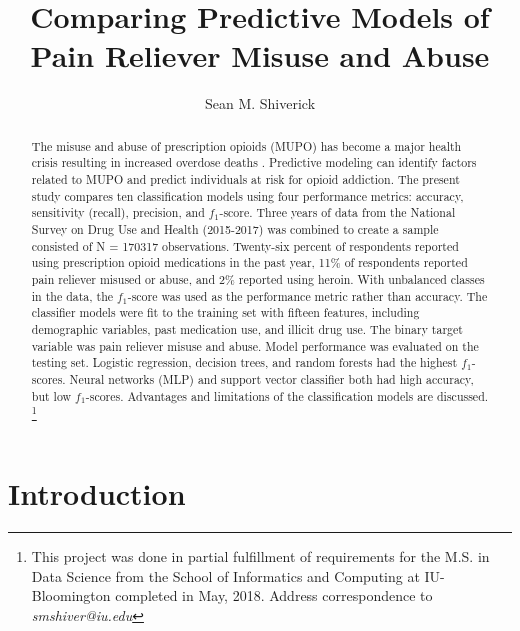 \documentclass[sigconf]{acmart}
\begin{document}
  \title{Comparing Predictive Models of Pain Reliever Misuse and Abuse}
  \author{Sean M. Shiverick}
\renewcommand{\shortauthors}{S.M. Shiverick}


\begin{abstract}

The misuse and abuse of prescription opioids (MUPO) has become a major 
health crisis resulting in increased overdose deaths \cite{nida18}. Predictive 
modeling can identify factors related to MUPO and  predict individuals at risk 
for opioid addiction. The present study compares ten classification models 
using four performance metrics: accuracy, sensitivity (recall), precision, and 
$f_1$-score. Three years of data from the National Survey on Drug Use and 
Health (2015-2017) was combined to create a sample consisted of N = 170317
observations. Twenty-six percent of respondents reported using prescription
opioid medications in the past year, 11\% of respondents reported pain 
reliever misused or abuse, and 2\% reported using heroin. With unbalanced 
classes in the data, the $f_1$-score was used as the performance metric 
rather than accuracy. The classifier models were fit to the training set with 
fifteen features, including demographic variables, past medication use, and 
illicit drug use. The binary target variable was pain reliever misuse and abuse. 
Model performance was evaluated on the testing set. Logistic regression, 
decision trees, and random forests had the highest $f_1$-scores. Neural networks 
(MLP) and support vector classifier both had high accuracy, but low $f_1$-scores. 
Advantages and limitations of the classification models are discussed. 
\footnote{This project was done in partial fulfillment of requirements 
for the M.S. in Data Science from the School of Informatics and Computing at 
IU-Bloomington completed in May, 2018. Address correspondence to 
\textit{smshiver@iu.edu}}

\end{abstract}
\maketitle

\section{Introduction}
\end{document}
